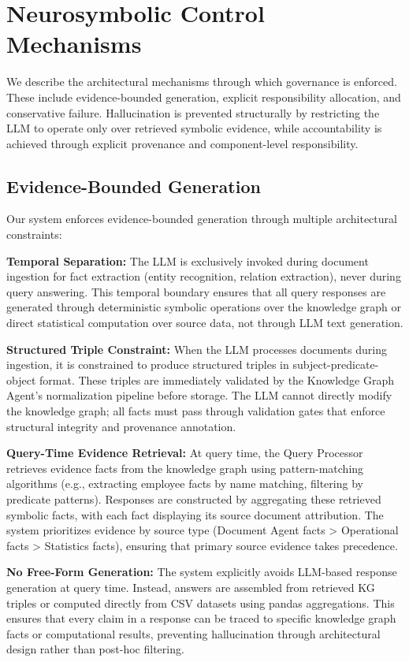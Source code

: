 \section{Neurosymbolic Control Mechanisms}

We describe the architectural mechanisms through which governance is enforced. These include evidence-bounded generation, explicit responsibility allocation, and conservative failure. Hallucination is prevented structurally by restricting the LLM to operate only over retrieved symbolic evidence, while accountability is achieved through explicit provenance and component-level responsibility.

\subsection{Evidence-Bounded Generation}

Our system enforces evidence-bounded generation through multiple architectural constraints:

\textbf{Temporal Separation:} The LLM is exclusively invoked during document ingestion for fact extraction (entity recognition, relation extraction), never during query answering. This temporal boundary ensures that all query responses are generated through deterministic symbolic operations over the knowledge graph or direct statistical computation over source data, not through LLM text generation.

\textbf{Structured Triple Constraint:} When the LLM processes documents during ingestion, it is constrained to produce structured triples in subject-predicate-object format. These triples are immediately validated by the Knowledge Graph Agent's normalization pipeline before storage. The LLM cannot directly modify the knowledge graph; all facts must pass through validation gates that enforce structural integrity and provenance annotation.

\textbf{Query-Time Evidence Retrieval:} At query time, the Query Processor retrieves evidence facts from the knowledge graph using pattern-matching algorithms (e.g., extracting employee facts by name matching, filtering by predicate patterns). Responses are constructed by aggregating these retrieved symbolic facts, with each fact displaying its source document attribution. The system prioritizes evidence by source type (Document Agent facts > Operational facts > Statistics facts), ensuring that primary source evidence takes precedence.

\textbf{No Free-Form Generation:} The system explicitly avoids LLM-based response generation at query time. Instead, answers are assembled from retrieved KG triples or computed directly from CSV datasets using pandas aggregations. This ensures that every claim in a response can be traced to specific knowledge graph facts or computational results, preventing hallucination through architectural design rather than post-hoc filtering.

